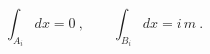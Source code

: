 \begin{equation}
    \label{eq:dx}
    \int_{A_i} dx =0\ ,\qquad\int_{B_i} dx = i\,m\ .
  \end{equation}

